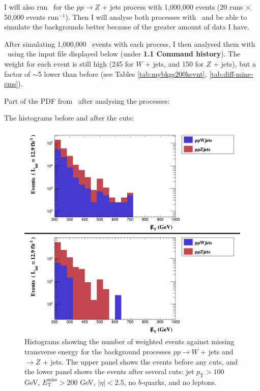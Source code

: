 I will also run \madgraph\ for the $pp \rightarrow Z$ + jets process with 1,000,000 events (20 runs $\times$ 50,000 events run$^{-1}$). Then I will analyse both processes with \madanalysis\ and be able to simulate the backgrounds better because of the greater amount of data I have.

After simulating 1,000,000 \madgraph\ events with each process, I then analysed them with \madanalysis\ using the input file displayed below (under \textbf{1.1 Command history}). The weight for each event is still high (245 for $W$ + jets, and 150 for $Z$ + jets), but a factor of $\sim$5 lower than before (see Tables \ref{tab:mybkgs200kevnt}, \ref{tab:diff-mine-cms}).

Part of the PDF from \madanalysis\ after analysing the processes: 



The histograms before and after the cuts:

\begin{figure}[H]
\centering
\includegraphics[width=\textwidth]{./sec15/combined_selection.png}
\caption{Histograms showing the number of weighted events against missing transverse energy for the background processes $pp \rightarrow W$ + jets and $\rightarrow Z$ + jets. The upper panel shows the events before any cuts, and the lower panel shows the events after several cuts: jet $p_{\mathrm{T}} > 100$ GeV, $E_{\mathrm{T}}^{\mathrm{miss}} > 200$ GeV, $|\eta| < 2.5$, no $b$-quarks, and no leptons.}
\end{figure}

